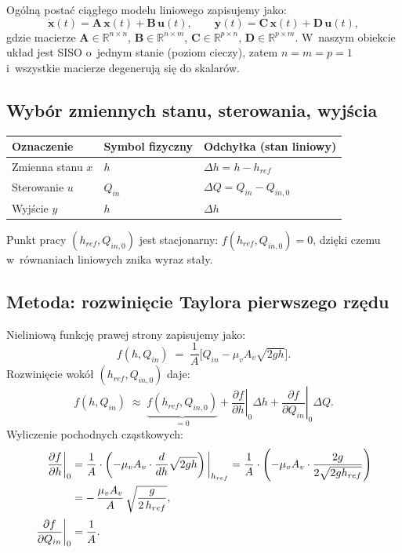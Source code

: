 \documentclass[11pt,a4paper]{article}
\begin{document}
Ogólną postać ciągłego modelu liniowego zapisujemy jako:
\begin{equation}
\dot{\mathbf x}(t) = \mathbf A\,\mathbf x(t) + \mathbf B\,\mathbf u(t),\qquad
\mathbf y(t) = \mathbf C\,\mathbf x(t) + \mathbf D\,\mathbf u(t),
\end{equation}
gdzie macierze $\mathbf A \in \mathbb R^{n\times n}$, $\mathbf B\in\mathbb R^{n\times m}$,
$\mathbf C\in\mathbb R^{p\times n}$, $\mathbf D\in\mathbb R^{p\times m}$. W~naszym
obiekcie układ jest SISO o~jednym stanie (poziom cieczy), zatem $n=m=p=1$ i~wszystkie
macierze degenerują się do skalarów.

\subsection{Wybór zmiennych stanu, sterowania, wyjścia}

\begin{center}
\begin{tabular}{@{}lll@{}}
\toprule
Oznaczenie & Symbol fizyczny & Odchyłka (stan liniowy) \\
\midrule
Zmienna stanu $x$   & $h$     & $\Delta h = h - h_{ref}$ \\
Sterowanie $u$      & $Q_{in}$& $\Delta Q = Q_{in} - Q_{in,0}$ \\
Wyjście $y$         & $h$     & $\Delta h$ \\
\bottomrule
\end{tabular}
\end{center}

Punkt pracy $(h_{ref},Q_{in,0})$ jest stacjonarny: $f(h_{ref},Q_{in,0}) = 0$,
dzięki czemu w~równaniach liniowych znika wyraz stały.

\subsection{Metoda: rozwinięcie Taylora pierwszego rzędu}

Nieliniową funkcję prawej strony zapisujemy jako:
\begin{equation}
f(h,Q_{in}) \;=\; \frac{1}{A}\Big[Q_{in} - \mu_v A_v\sqrt{2gh}\Big].
\end{equation}
Rozwinięcie wokół $(h_{ref},Q_{in,0})$ daje:
\begin{equation}
f(h,Q_{in}) \;\approx\; \underbrace{f(h_{ref},Q_{in,0})}_{=0}
+ \left.\frac{\partial f}{\partial h}\right|_{0}\!\Delta h
+ \left.\frac{\partial f}{\partial Q_{in}}\right|_{0}\!\Delta Q.
\end{equation}
Wyliczenie pochodnych cząstkowych:
\begin{align}
\left.\frac{\partial f}{\partial h}\right|_{0}
&= \frac{1}{A}\cdot\left(-\mu_v A_v\cdot\frac{d}{dh}\sqrt{2gh}\right)\bigg|_{h_{ref}}
 = \frac{1}{A}\cdot\left(-\mu_v A_v\cdot\frac{2g}{2\sqrt{2gh_{ref}}}\right) \notag \\
&= -\,\frac{\mu_v A_v}{A}\,\sqrt{\frac{g}{2\,h_{ref}}}, \\[2pt]
\left.\frac{\partial f}{\partial Q_{in}}\right|_{0} &= \frac{1}{A}.
\end{align}
\end{document}
